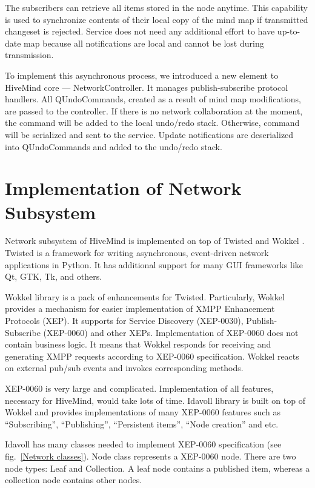 The subscribers can retrieve all items stored in the node anytime. This
capability is used to synchronize contents of their local copy of the mind map
if transmitted changeset is rejected. Service does not need any additional
effort to have up-to-date map because all notifications are local and cannot be
lost during transmission.

To implement this asynchronous process, we introduced a new element to HiveMind
core --- NetworkController. It manages publish-subscribe protocol handlers. All
QUndoCommands, created as a result of mind map modifications, are passed to the
controller. If there is no network collaboration at the moment, the command will
be added to the local undo/redo stack. Otherwise, command will be serialized and
sent to the service. Update notifications are deserialized into QUndoCommands
and added to the undo/redo stack.


\section{Implementation of Network Subsystem}

Network subsystem of HiveMind is implemented on top of Twisted \cite{twisted} and
Wokkel \cite{wokkel}. Twisted is a framework for writing asynchronous,
event-driven network applications in Python. It has additional support for many
GUI frameworks like Qt, GTK, Tk, and others.

Wokkel library is a pack of enhancements for Twisted. Particularly, Wokkel
provides a mechanism for easier implementation of XMPP Enhancement Protocols
(XEP). It supports for Service Discovery (XEP-0030), Publish-Subscribe
(XEP-0060) and other XEPs. Implementation of XEP-0060 does not contain business
logic. It means that Wokkel responds for receiving and generating XMPP requests
according to XEP-0060 specification. Wokkel reacts on external pub/sub events
and invokes corresponding methods.

XEP-0060 is very large and complicated. Implementation of all features,
necessary for HiveMind, would take lots of time. Idavoll library is built on top
of Wokkel and provides implementations of many XEP-0060 features such as
``Subscribing'', ``Publishing'', ``Persistent items'', ``Node creation'' and
etc.

Idavoll has many classes needed to implement XEP-0060 specification (see
fig.~\ref{Network classes}). Node class represents a XEP-0060 node. There are
two node types: Leaf and Collection. A leaf node contains a published item,
whereas a collection node contains other nodes.

